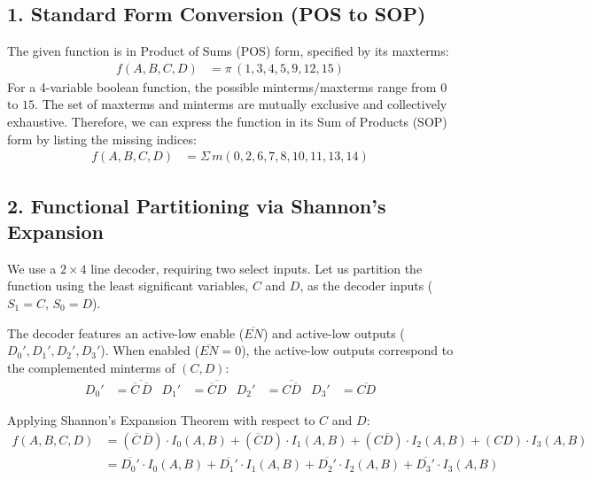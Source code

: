 \documentclass[12pt,a3paper]{article}
\begin{document}
\begin{enumerate}
\begin{tcolorbox}[enhanced,breakable,ansbox,colback=cD!4,colframe=cD,boxrule=0.8pt,arc=5pt,title={\textbf{Answer}},fonttitle=\bfseries\color{white},colbacktitle=cD]

\subsection*{1. Standard Form Conversion (POS to SOP)}
The given function is in Product of Sums (POS) form, specified by its maxterms:
\begin{align*}
    f(A,B,C,D) &= \pi\,(1, 3, 4, 5, 9, 12, 15)
\end{align*}
For a 4-variable boolean function, the possible minterms/maxterms range from $0$ to $15$. The set of maxterms and minterms are mutually exclusive and collectively exhaustive. Therefore, we can express the function in its Sum of Products (SOP) form by listing the missing indices:
\begin{align*}
    f(A,B,C,D) &= \Sigma\,m(0, 2, 6, 7, 8, 10, 11, 13, 14)
\end{align*}

\subsection*{2. Functional Partitioning via Shannon's Expansion}
We use a $2 \times 4$ line decoder, requiring two select inputs. Let us partition the function using the least significant variables, $C$ and $D$, as the decoder inputs ($S_1 = C$, $S_0 = D$).

The decoder features an active-low enable ($\overline{EN}$) and active-low outputs ($D_0', D_1', D_2', D_3'$). When enabled ($\overline{EN}=0$), the active-low outputs correspond to the complemented minterms of $(C, D)$:
\begin{align*}
    D_0' &= \overline{\overline{C}\,\overline{D}} & D_1' &= \overline{\overline{C}D} & D_2' &= \overline{C\overline{D}} & D_3' &= \overline{CD}
\end{align*}

Applying Shannon's Expansion Theorem with respect to $C$ and $D$:
\begin{align*}
    f(A, B, C, D) &= (\overline{C}\,\overline{D}) \cdot I_0(A, B) + (\overline{C}D) \cdot I_1(A, B) + (C\overline{D}) \cdot I_2(A, B) + (CD) \cdot I_3(A, B) \\
    &= \overline{D_0'} \cdot I_0(A, B) + \overline{D_1'} \cdot I_1(A, B) + \overline{D_2'} \cdot I_2(A, B) + \overline{D_3'} \cdot I_3(A, B)
\end{align*}


\end{tcolorbox}
\end{enumerate}
\end{document}
